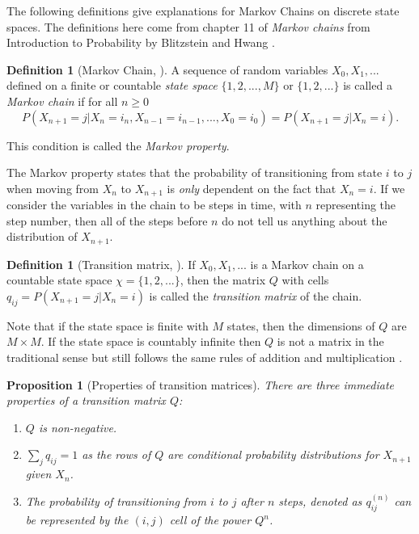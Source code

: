 \documentclass[11pt]{amsart}
\theoremstyle{theorem} %
\newtheorem{prop}[thm]{Proposition}
\theoremstyle{definition}                  %
\newtheorem{defn}[thm]{Definition}
\theoremstyle{example}                       %
\theoremstyle{remark}                       %
\numberwithin{equation}{section}
\begin{document}
The following definitions give explanations for Markov Chains on discrete state spaces. The definitions here come from chapter 11 of \emph{Markov chains} from Introduction to Probability by Blitzstein and Hwang \cite{blitzstein}.

\begin{defn}[{Markov Chain, \cite[p.~459]{blitzstein}}]
    A sequence of random variables $X_0, X_1, ...$ defined on a finite or countable \emph{state space} $\{1, 2, ... , M\}$ or $\{1, 2, ...\}$ is called a \emph{Markov chain} if for all $n\geq0$
    \[P(X_{n+1}=j|X_n=i_n, X_{n-1}=i_{n-1}, ... , X_0=i_0)=P(X_{n+1}=j|X_n=i).\] 
    
    This condition is called the \emph{Markov property}.
    
\end{defn}

The Markov property states that the probability of transitioning from state $i$ to $j$ when moving from $X_n$ to $X_{n+1}$ is \emph{only} dependent on the fact that $X_n=i$. If we consider the variables in the chain to be steps in time, with $n$ representing the step number, then all of the steps before $n$ do not tell us anything about the distribution of $X_{n+1}$.

\begin{defn}[{Transition matrix, \cite[p.460]{blitzstein}}]
    If $X_0, X_1, ...$ is a Markov chain on a countable state space $\chi=\{1, 2, ...\}$, then the matrix $Q$ with cells $q_{ij}=P(X_{n+1}=j|X_n=i)$ is called the \emph{transition matrix} of the chain.
\end{defn}

Note that if the state space is finite with $M$ states, then the dimensions of $Q$ are $M \times M$. If the state space is countably infinite then $Q$ is not a matrix in the traditional sense but still follows the same rules of addition and multiplication \cite[p.~58]{pierre}.

\begin{prop}[Properties of transition matrices]
There are three immediate properties of a transition matrix $Q$:
\begin{enumerate}
    \item $Q$ is non-negative. 
    \item $\sum_{j}q_{ij}=1$ as the rows of $Q$ are conditional probability distributions for $X_{n+1}$ given $X_n$.
    \item The probability of transitioning from $i$ to $j$ after $n$ steps, denoted as $q^{(n)}_{ij}$ can be represented by the $(i,j)$ cell of the power $Q^n$. 
\end{enumerate}
\end{prop}
\end{document}
